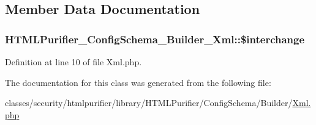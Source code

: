 \subsection{Member Data Documentation}
\hypertarget{classHTMLPurifier__ConfigSchema__Builder__Xml_a0f53d08db98000fe4c9f0082a8fa7ba1}{
\subsubsection[{\$interchange}]{\setlength{\rightskip}{0pt plus 5cm}H\+T\+M\+L\+Purifier\+\_\+\+Config\+Schema\+\_\+\+Builder\+\_\+\+Xml\+::\$interchange\hspace{0.3cm}{\ttfamily [protected]}}}\label{classHTMLPurifier__ConfigSchema__Builder__Xml_a0f53d08db98000fe4c9f0082a8fa7ba1}


Definition at line 10 of file Xml.\+php.



The documentation for this class was generated from the following file\+:\begin{DoxyCompactItemize}
\item 
classes/security/htmlpurifier/library/\+H\+T\+M\+L\+Purifier/\+Config\+Schema/\+Builder/\hyperlink{Xml_8php}{Xml.\+php}\end{DoxyCompactItemize}
